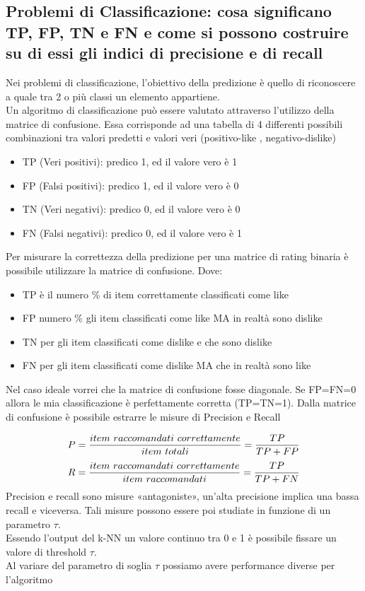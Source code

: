 \documentclass[12pt]{article}
\begin{document}
\subsection{Problemi di Classificazione: cosa significano TP, FP, TN e FN e come si possono costruire su di essi gli indici di precisione e di recall}
Nei problemi di classificazione, l’obiettivo della predizione è quello di riconoscere a quale tra 2 o più classi un elemento appartiene.
\\Un algoritmo di classificazione può essere valutato attraverso l’utilizzo della matrice di confusione. Essa corrisponde ad una
tabella di 4 differenti possibili combinazioni tra valori predetti e valori veri (positivo-like , negativo-dislike)
\begin{itemize}
    \item TP (Veri positivi): predico 1, ed il valore vero è 1
    \item FP (Falsi positivi): predico 1, ed il valore vero è 0
    \item TN (Veri negativi): predico 0, ed il valore vero è 0
    \item FN (Falsi negativi): predico 0, ed il valore vero è 1
\end{itemize}
Per misurare la correttezza della predizione per una matrice di rating binaria è possibile utilizzare la matrice di confusione.
Dove:
\begin{itemize}
    \item TP è il numero \% di item correttamente classificati come like
    \item FP numero \% gli item classificati come like MA in realtà sono dislike
    \item TN per gli item classificati come dislike e che sono dislike
    \item FN per gli item classificati come dislike MA che in realtà sono like
\end{itemize}

Nel caso ideale vorrei che la matrice di confusione fosse diagonale.
Se FP=FN=0 allora le mia classificazione è perfettamente corretta (TP=TN=1).
Dalla matrice di confusione è possibile estrarre le misure di Precision e Recall

$$P = {item \ raccomandati \ correttamente \over item \ totali} = {TP \over {TP + FP}}$$
$$R = {item \ raccomandati \ correttamente \over item \ raccomandati}= {TP \over {TP + FN}}$$
Precision e recall sono misure «antagoniste», un'alta precisione implica una bassa recall e viceversa.
Tali misure possono essere poi studiate in funzione di un parametro $\tau$.\\
Essendo l’output del k-NN un valore continuo tra 0 e 1 è possibile fissare un valore di threshold $\tau$.\\
Al variare del parametro di soglia $\tau$ possiamo avere performance diverse per l’algoritmo
\end{document}
